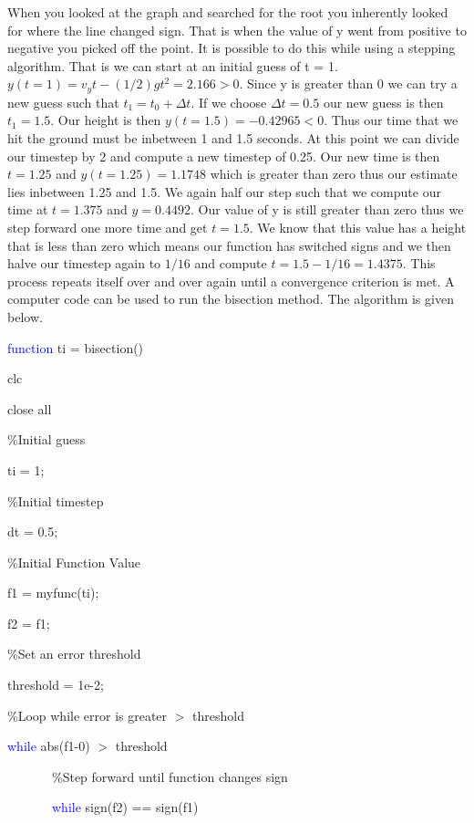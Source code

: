 \begin{enumerate}
When you looked at the graph and searched for the root you inherently
looked for where the line changed sign. That is when the value of y
went from positive to negative you picked off the point. It is
possible to do this while using a stepping algorithm. That is we can
start at an initial guess of t = 1. $y(t=1) = v_yt - (1/2)gt^2 =
2.166 > 0$. Since y is greater than 0 we can try a new guess such that
$t_1 = t_0 + \Delta t$. If we choose $\Delta t = 0.5$ our new guess is
then $t_1 = 1.5$. Our height is then $y(t=1.5) = -0.42965 < 0$. Thus
our time that we hit the ground must be inbetween 1 and 1.5
seconds. At this point we can divide our timestep by 2 and compute a
new timestep of 0.25. Our new time is then $t=1.25$ and $y(t=1.25) =
1.1748$ which is greater than zero thus our estimate lies inbetween
1.25 and 1.5. We again half our step such that we compute our time at
$t=1.375$ and $y=0.4492$. Our value of y is still greater than zero
thus we step forward one more time and get $t=1.5$. We know that this
value has a height that is less than zero which means our function has
switched signs and we then halve our timestep again to $1/16$ and
compute $t=1.5-1/16=1.4375$. This process repeats itself over and over
again until a convergence criterion is met. A computer code can be
used to run the bisection method. The algorithm is given below.

\begin{framed}
\textcolor{blue}{function} ti = bisection()

clc

close all

\textcolor{OliveGreen}{\%Initial guess}

ti = 1;

\textcolor{OliveGreen}{\%Initial timestep}

dt = 0.5;

\textcolor{OliveGreen}{\%Initial Function Value}

f1 = myfunc(ti);

f2 = f1;

\textcolor{OliveGreen}{\%Set an error threshold}

threshold = 1e-2;

\textcolor{OliveGreen}{\%Loop while error is greater $>$ threshold}

\textcolor{blue}{while} abs(f1-0) $>$ threshold

~~~~~~~\textcolor{OliveGreen}{\%Step forward until function changes sign}

~~~~~~~\textcolor{blue}{while} sign(f2) == sign(f1)


\end{framed}
\end{enumerate}
